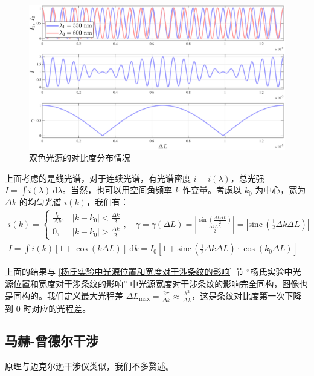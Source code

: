\documentclass[UTF8]{report}
\def\sinc{\mathrm{sinc}\,}
\theoremstyle{MyLineTheoremStyle} %
\theoremstyle{MyBlockTheoremStyle} %
\theoremstyle{MySubsubsectionStyle} %
\begin{document}
\begin{figure}[H]\centering
\includegraphics[width=0.85\columnwidth]{assets/3/迈克尔逊干涉_双色光源.pdf}
\caption{ 双色光源的对比度分布情况}\label{双色光源的对比度分布情况}
\end{figure}

上面考虑的是线光谱，对于连续光谱，有光谱密度 $i = i(\lambda)$，总光强 $I = \int i(\lambda)\ \mathrm{d}\lambda$。当然，也可以用空间角频率 $k$ 作变量。考虑以 $k_0$ 为中心，宽为 $\Delta k$ 的均匀光谱 $i(k)$，我们有：
\begin{gather}\label{光谱宽度对对比度的影响}
i (k) = 
\begin{cases}
    \frac{I_0}{\Delta k}, & |k - k_0| < \frac{\Delta k}{2} \\
    0, & |k - k_0| > \frac{\Delta k}{2}
\end{cases} ,\quad \gamma = \gamma(\Delta L) = \left| \frac{\sin \left(\frac{\Delta k \Delta L}{2}\right)}{\frac{\Delta k \Delta L}{2}} \right| = \left| \sinc \left( \frac{1}{2}\Delta k \Delta L\right) \right| 
\\
I = \int i(k)\left[1 + \cos (k \Delta L)\right] \ \mathrm{d}k = I_0 \left[ 1 + \sinc \left( \frac{1}{2}\Delta k \Delta L\right) \cdot \cos (k_0 \Delta L)\right]
\end{gather}

上面的结果与 \ref{杨氏实验中光源位置和宽度对干涉条纹的影响} 节 “杨氏实验中光源位置和宽度对干涉条纹的影响” 中光源宽度对干涉条纹的影响完全同构，图像也是同构的。我们定义最大光程差 $\Delta L_{\max} = \frac{2 \pi}{\Delta k} \approx \frac{\lambda^2}{\Delta \lambda}$，这是条纹对比度第一次下降到 0 时对应的光程差。

\subsection{马赫-曾德尔干涉}

原理与迈克尔逊干涉仪类似，我们不多赘述。
\end{document}
